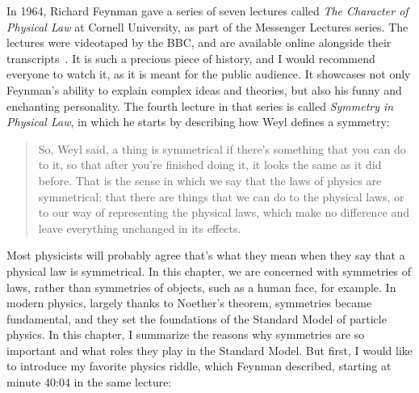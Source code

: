 In 1964, Richard Feynman gave a series of seven lectures called \emph{The Character of Physical Law} at Cornell University, as part of the Messenger Lectures series. The lectures were videotaped by the BBC, and are available online alongside their transcripts~\cite{Feynman1997-vo}. It is such a precious piece of history, and I would recommend everyone to watch it, as it is meant for the public audience. It showcases not only Feynman's ability to explain complex ideas and theories, but also his funny and enchanting personality. The fourth lecture in that series is called \emph{Symmetry in Physical Law}, in which he starts by describing how Weyl defines a symmetry:

\begin{quote}
So, Weyl said, a thing is symmetrical if there’s something that you can do to it, so that after you’re finished doing it, it looks the same as it did before. That is the sense in which we say that the laws of physics are symmetrical: that there are things that we can do to the physical laws, or to our way of representing the physical laws, which make no difference and leave everything unchanged in its effects.
\end{quote}

Most physicists will probably agree that's what they mean when they say that a physical law is symmetrical. In this chapter, we are concerned with symmetries of laws, rather than symmetries of objects, such as a human face, for example. In modern physics, largely thanks to Noether's theorem, symmetries became fundamental, and they set the foundations of the Standard Model of particle physics. In this chapter, I summarize the reasons why symmetries are so important and what roles they play in the Standard Model. But first, I would like to introduce my favorite physics riddle, which Feynman described, starting at minute 40:04 in the same lecture:

